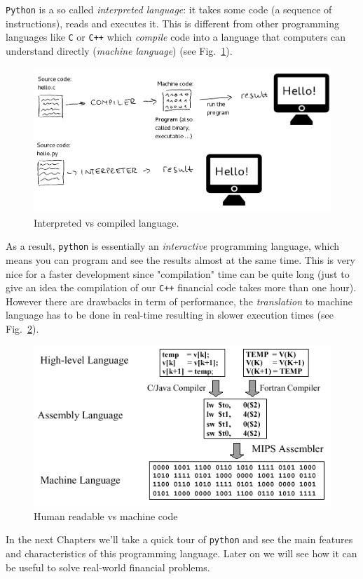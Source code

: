 \texttt{Python} is a so called \emph{interpreted language}: it takes some code (a sequence of instructions), reads and executes it. This is different from other programming languages like \texttt{C} or \texttt{C++} which \emph{compile} code into a language that computers can understand directly (\emph{machine language}) (see Fig.~\ref{fig:compiled_vs_interpreted}).

\begin{figure}[htbp]
\centering
\includegraphics[width=0.7\linewidth]{figures/compiled_language}
\caption{Interpreted vs compiled language.}
\label{fig:compiled_vs_interpreted}
\end{figure}

As a result, \texttt{python} is essentially an \emph{interactive} programming language, which means you can program and see the results almost at the same time. This is very nice for a faster development since "compilation" time can be quite long (just to give an idea the compilation of our \texttt{C++} financial code takes more than one hour).
However there are drawbacks in term of performance, the \emph{translation} to machine language has to be done in real-time resulting in slower execution times (see Fig.~\ref{fig:compilation}).

\begin{figure}[htbp]
\centering
\includegraphics[width=0.5\linewidth]{figures/machine_language.png}
\caption{Human readable vs machine code}
\label{fig:compilation}
\end{figure}

In the next Chapters we'll take a quick tour of \texttt{python} and see the main features and characteristics of this programming language. Later on we will see how it can be useful to solve real-world financial problems.

